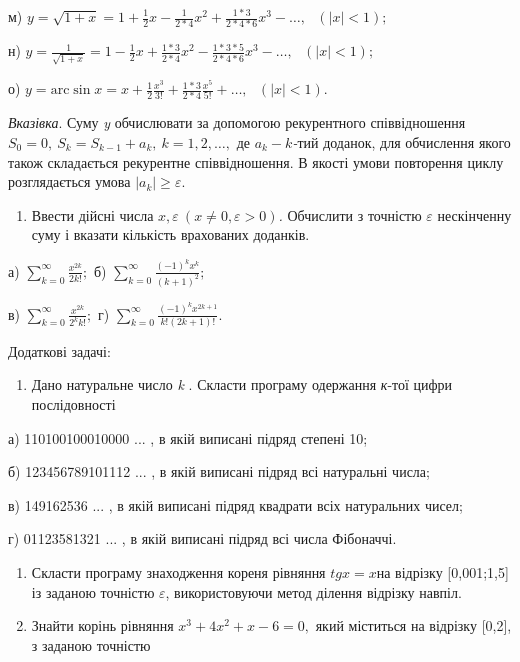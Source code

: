 \documentclass[]{article}
\begin{document}
м)
\(y = \sqrt{1 + x} = 1 + \frac{1}{2}x - \frac{1}{2*4}x^{2} + \frac{1*3}{2*4*6}x^{3} - \ldots,\mathrm{\text{\ \ \ \ \ }}(\left| x \right| < 1);\)

н)
\(y = \frac{1}{\sqrt{1 + x}} = 1 - \frac{1}{2}x + \frac{1*3}{2*4}x^{2} - \frac{1*3*5}{2*4*6}x^{3} - \ldots,\mathrm{\text{\ \ \ \ \ }}(\left| x \right| < 1);\)

о)
\(y = \mathrm{\text{arc}}\sin x = x + \frac{1}{2}\frac{x^{3}}{3!} + \frac{1*3}{2*4}\frac{x^{5}}{5!} + \ldots,\mathrm{\text{\ \ \ \ \ \ \ }}(\left| x \right|\mathrm{< 1}).\)

\emph{\emph{Вказівка}}. Суму \emph{y} обчислювати за допомогою
рекурентного співвідношення
\(S_{0} = 0,\ S_{k} = S_{k - 1} + a_{k},\ k = 1,2,\ldots,\) де
\(a_{k} - k\)\emph{-}тий доданок, для обчислення якого також складається
рекурентне співвідношення. В якості умови повторення циклу розглядається
умова \(\left| a_{k} \right| \geq \varepsilon.\)

\begin{enumerate}
\def\labelenumi{\arabic{enumi})}
\item
  Ввести дійсні числа
  \(x,\varepsilon\ (x \neq 0,\varepsilon > 0)\)\emph{.} Обчислити з
  точністю \(\varepsilon\) нескінченну суму і вказати кількість
  врахованих доданків.
\end{enumerate}

а) \(\sum_{k = 0}^{\infty}\frac{x^{2k}}{2k!};\) б)
\(\sum_{k = 0}^{\infty}\frac{( - 1)^{k}x^{k}}{(k + 1)^{2}};\)

в) \(\sum_{k = 0}^{\infty}\frac{x^{2k}}{2^{k}k!};\) г)
\(\sum_{k = 0}^{\infty}\frac{( - 1)^{k}x^{2k + 1}}{k!(2k + 1)!}.\)

Додаткові задачі:

\begin{enumerate}
\def\labelenumi{\arabic{enumi})}
\item
  Дано натуральне число \emph{k} . Скласти програму одержання
  \emph{к}-тої цифри послідовності
\end{enumerate}

а) 110100100010000 ... , в якій виписані підряд степені 10;

б) 123456789101112 ... , в якій виписані підряд всі натуральні числа;

в) 149162536 ... , в якій виписані підряд квадрати всіх натуральних
чисел;

г) 01123581321 ... , в якій виписані підряд всі числа Фібоначчі.

\begin{enumerate}
\def\labelenumi{\arabic{enumi})}
\item
  Скласти програму знаходження кореня рівняння \(tgx = x\)на відрізку
  {[}0,001;1,5{]} із заданою точністю \(\varepsilon\), використовуючи
  метод ділення відрізку навпіл.
\item
  Знайти корінь рівняння \(x^{3} + 4x^{2} + x - 6 = 0,\) який міститься
  на відрізку {[}0,2{]}, з заданою точністю
\end{enumerate}
\end{document}
